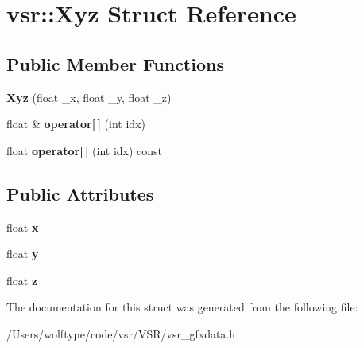 \hypertarget{structvsr_1_1_xyz}{\section{vsr\-:\-:Xyz Struct Reference}
\label{structvsr_1_1_xyz}
}
\subsection*{Public Member Functions}
\begin{DoxyCompactItemize}
\item 
\hypertarget{structvsr_1_1_xyz_a7f0a1e8063678d38342264835d425880}{{\bfseries Xyz} (float \-\_\-x, float \-\_\-y, float \-\_\-z)}\label{structvsr_1_1_xyz_a7f0a1e8063678d38342264835d425880}

\item 
\hypertarget{structvsr_1_1_xyz_a59292673955796b7321e1ab61012b71b}{float \& {\bfseries operator\mbox{[}$\,$\mbox{]}} (int idx)}\label{structvsr_1_1_xyz_a59292673955796b7321e1ab61012b71b}

\item 
\hypertarget{structvsr_1_1_xyz_a71dcd1cdb77c115f425db6df44bf27d3}{float {\bfseries operator\mbox{[}$\,$\mbox{]}} (int idx) const }\label{structvsr_1_1_xyz_a71dcd1cdb77c115f425db6df44bf27d3}

\end{DoxyCompactItemize}
\subsection*{Public Attributes}
\begin{DoxyCompactItemize}
\item 
\hypertarget{structvsr_1_1_xyz_a0125197559de26d85da10405bec10a60}{float {\bfseries x}}\label{structvsr_1_1_xyz_a0125197559de26d85da10405bec10a60}

\item 
\hypertarget{structvsr_1_1_xyz_a86162ac52047e97b0c27dfa4172aaf47}{float {\bfseries y}}\label{structvsr_1_1_xyz_a86162ac52047e97b0c27dfa4172aaf47}

\item 
\hypertarget{structvsr_1_1_xyz_a167152b9b82b3377b3d95ab8ad945e6f}{float {\bfseries z}}\label{structvsr_1_1_xyz_a167152b9b82b3377b3d95ab8ad945e6f}

\end{DoxyCompactItemize}


The documentation for this struct was generated from the following file\-:\begin{DoxyCompactItemize}
\item 
/\-Users/wolftype/code/vsr/\-V\-S\-R/vsr\-\_\-gfxdata.\-h\end{DoxyCompactItemize}
